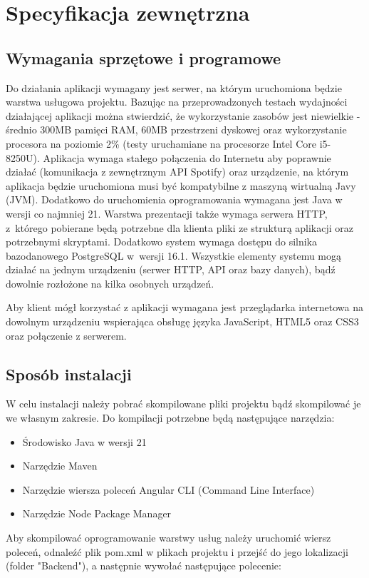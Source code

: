 \chapter{Specyfikacja zewnętrzna}
\label{ch:04}
\section{Wymagania sprzętowe i programowe}
Do działania aplikacji wymagany jest serwer, na którym uruchomiona będzie warstwa usługowa projektu. Bazując na przeprowadzonych testach wydajności działającej aplikacji można stwierdzić, że wykorzystanie zasobów jest niewielkie - średnio 300MB pamięci RAM, 60MB przestrzeni dyskowej oraz wykorzystanie procesora na poziomie 2\% (testy uruchamiane na procesorze Intel Core i5-8250U). Aplikacja wymaga stałego połączenia do Internetu aby poprawnie działać (komunikacja z zewnętrznym API Spotify) oraz urządzenie, na którym aplikacja będzie uruchomiona musi być kompatybilne z maszyną wirtualną Javy (JVM). Dodatkowo do uruchomienia oprogramowania wymagana jest Java w wersji co najmniej 21. Warstwa prezentacji także wymaga serwera HTTP, z~którego pobierane będą potrzebne dla klienta pliki ze strukturą aplikacji oraz potrzebnymi skryptami. Dodatkowo system wymaga dostępu do silnika bazodanowego PostgreSQL w~wersji 16.1. Wszystkie elementy systemu mogą działać na jednym urządzeniu (serwer HTTP, API oraz bazy danych), bądź dowolnie rozłożone na kilka osobnych urządzeń.

Aby klient mógł korzystać z aplikacji wymagana jest przeglądarka internetowa na dowolnym urządzeniu wspierająca obsługę języka JavaScript, HTML5 oraz CSS3 oraz połączenie z serwerem.

\section{Sposób instalacji}
W celu instalacji należy pobrać skompilowane pliki projektu bądź skompilować je we własnym zakresie. Do kompilacji potrzebne będą następujące narzędzia: 
\begin{itemize}
\item Środowisko Java w wersji 21
\item Narzędzie Maven
\item Narzędzie wiersza poleceń Angular CLI (Command Line Interface)
\item Narzędzie Node Package Manager
\end{itemize}

Aby skompilować oprogramowanie warstwy usług należy uruchomić wiersz poleceń, odnaleźć plik pom.xml w plikach projektu i przejść do jego lokalizacji (folder "Backend"), a następnie wywołać następujące polecenie: 

